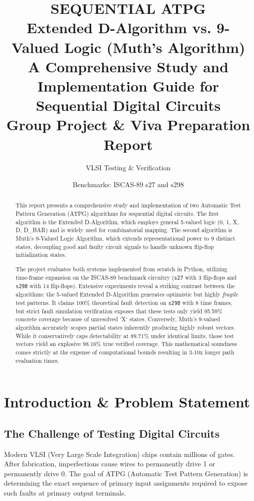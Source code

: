 \documentclass[12pt, a4paper]{article}
\title{\textbf{SEQUENTIAL ATPG} \\ \Large Extended D-Algorithm vs. 9-Valued Logic (Muth's Algorithm) \\ \vspace{0.5cm} \large A Comprehensive Study and Implementation Guide for Sequential Digital Circuits \\ \vspace{0.5cm} \normalsize Group Project \& Viva Preparation Report}
\author{VLSI Testing \& Verification}
\date{Benchmarks: ISCAS-89 s27 and s298}
\begin{document}
\maketitle

\begin{abstract}
\noindent This report presents a comprehensive study and implementation of two Automatic Test Pattern Generation (ATPG) algorithms for sequential digital circuits. The first algorithm is the Extended D-Algorithm, which employs general 5-valued logic (0, 1, X, D, D\_BAR) and is widely used for combinatorial mapping. The second algorithm is Muth's 9-Valued Logic Algorithm, which extends representational power to 9 distinct states, decoupling good and faulty circuit signals to handle unknown flip-flop initialization states. 

The project evaluates both systems implemented from scratch in Python, utilizing time-frame expansion on the ISCAS-89 benchmark circuitry (\texttt{s27} with 3 flip-flops and \texttt{s298} with 14 flip-flops). Extensive experiments reveal a striking contrast between the algorithms: the 5-valued Extended D-Algorithm generates optimistic but highly \textit{fragile} test patterns. It claims 100\% theoretical fault detection on \texttt{s298} with 8 time frames, but strict fault simulation verification exposes that these tests only yield 95.59\% concrete coverage because of unresolved `X` states. Conversely, Muth's 9-valued algorithm accurately scopes partial states inherently producing highly robust vectors. While it conservatively caps detectability at 89.71\% under identical limits, those test vectors yield an explosive 98.16\% true verified coverage. This mathematical soundness comes strictly at the expense of computational bounds resulting in 3-10x longer path evaluation times.
\end{abstract}

\newpage
\tableofcontents
\newpage

\section{Introduction \& Problem Statement}

\subsection{The Challenge of Testing Digital Circuits}
Modern VLSI (Very Large Scale Integration) chips contain millions of gates. After fabrication, imperfections cause wires to permanently drive 1 or permanently drive 0. The goal of ATPG (Automatic Test Pattern Generation) is determining the exact sequence of primary input assignments required to expose such faults at primary output terminals.
\end{document}
